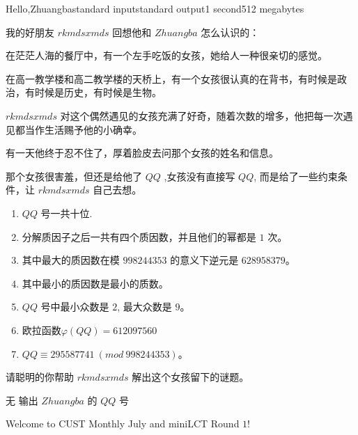 \begin{problem}{Hello,Zhuangba}{standard input}{standard output}{1 second}{512 megabytes}

我的好朋友 $rkmdsxmds$ 回想他和 $Zhuangba$ 怎么认识的：

在茫茫人海的餐厅中，有一个左手吃饭的女孩，她给人一种很亲切的感觉。

在高一教学楼和高二教学楼的天桥上，有一个女孩很认真的在背书，有时候是政治，有时候是历史，有时候是生物。

$rkmdsxmds$ 对这个偶然遇见的女孩充满了好奇，随着次数的增多，他把每一次遇见都当作生活赐予他的小确幸。

有一天他终于忍不住了，厚着脸皮去问那个女孩的姓名和信息。

那个女孩很害羞，但还是给他了 $QQ$ ,女孩没有直接写 $QQ$, 而是给了一些约束条件，让 $rkmdsxmds$ 自己去想。 
\begin{enumerate}
\item $QQ$ 号一共十位.
\item 分解质因子之后一共有四个质因数，并且他们的幂都是 $1$ 次。
\item 其中最大的质因数在模 $998244353$ 的意义下逆元是 $628958379$。
\item 其中最小的质因数是最小的质数。
\item $QQ$ 号中最小众数是 $2$, 最大众数是 $9$。
\item 欧拉函数$\varphi(QQ)=612097560$ 
\item $QQ\equiv 295587741\ (mod\ 998244353)$。
\end{enumerate}
请聪明的你帮助 $rkmdsxmds$ 解出这个女孩留下的谜题。

\InputFile
无
\OutputFile
输出 $Zhuangba$ 的 $QQ$ 号

\Example

\begin{example}
%
\end{example}

\Notes

Welcome to CUST Monthly July and miniLCT Round $\mathrm{1}$!

\end{problem}

